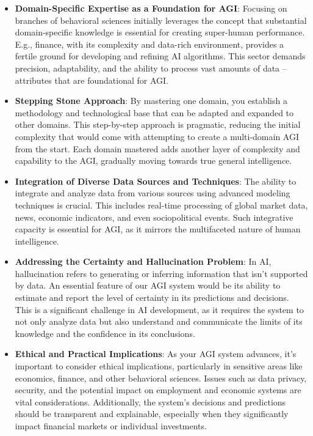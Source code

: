 \documentclass[11pt, reqno]{amsart}
\theoremstyle{definition}
\theoremstyle{remark}
\begin{document}
  \begin{itemize}
    \item \textbf{Domain-Specific Expertise as a Foundation for AGI}: Focusing on
      branches of behavioral sciences initially leverages the concept that
      substantial domain-specific knowledge is essential for creating
      super-human performance. E.g., finance, with its complexity and data-rich
      environment, provides a fertile ground for developing and refining AI
      algorithms. This sector demands precision, adaptability, and the ability
      to process vast amounts of data – attributes that are foundational for
      AGI.

    \item \textbf{Stepping Stone Approach}: By mastering one domain, you
      establish a methodology and technological base that can be adapted and
      expanded to other domains. This step-by-step approach is pragmatic,
      reducing the initial complexity that would come with attempting to create
      a multi-domain AGI from the start. Each domain mastered adds another layer
      of complexity and capability to the AGI, gradually moving towards true
      general intelligence.

    \item \textbf{Integration of Diverse Data Sources and Techniques}: The ability
      to integrate and analyze data from various sources using advanced modeling
      techniques is crucial. This includes real-time processing of global market
      data, news, economic indicators, and even sociopolitical events. Such
      integrative capacity is essential for AGI, as it mirrors the multifaceted nature
      of human intelligence.

    \item \textbf{Addressing the Certainty and Hallucination Problem}: In AI,
      hallucination refers to generating or inferring information that isn't
      supported by data. An essential feature of our AGI system would be its
      ability to estimate and report the level of certainty in its predictions
      and decisions. This is a significant challenge in AI development, as it
      requires the system to not only analyze data but also understand and
      communicate the limits of its knowledge and the confidence in its
      conclusions.

    \item \textbf{Ethical and Practical Implications}: As your AGI system advances,
      it's important to consider ethical implications, particularly in
      sensitive areas like economics, finance, and other behavioral sciences.
      Issues such as data privacy, security, and the potential impact on
      employment and economic systems are vital considerations. Additionally,
      the system's decisions and predictions should be transparent and
      explainable, especially when they significantly impact financial markets
      or individual investments.
  \end{itemize}
\end{document}
